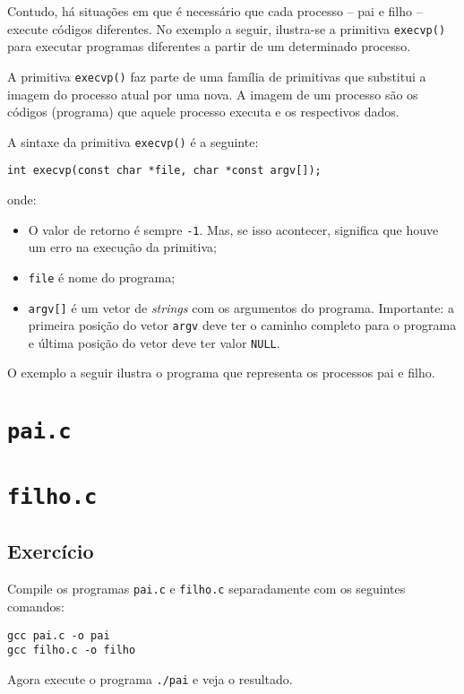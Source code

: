 Contudo, há situações em que é necessário que cada processo -- pai e filho -- execute códigos diferentes. No exemplo a seguir, ilustra-se a primitiva \texttt{execvp()} para executar programas diferentes a partir de um determinado processo. 

A primitiva \texttt{execvp()} faz parte de uma família de primitivas que substitui a imagem do processo atual por uma nova. A imagem de um processo são os códigos (programa) que aquele processo executa e os respectivos dados.

A sintaxe da primitiva \texttt{execvp()} é a seguinte:

\begin{lstlisting}[style=MyCStyle, frame=none, numbers=none]
int execvp(const char *file, char *const argv[]);
\end{lstlisting}
 
onde: 
\begin{itemize}
    \item O valor de retorno é sempre \texttt{-1}. Mas, se isso acontecer, significa que houve um erro na execução da primitiva;
    \item \texttt{file} é nome do programa;
    \item \texttt{argv[]} é um vetor de \textit{strings} com os argumentos do programa. Importante: a primeira posição do vetor \texttt{argv} deve ter o caminho completo para o programa e última posição do vetor deve ter valor \texttt{NULL}.
 \end{itemize}
 
 O exemplo a seguir ilustra o programa que representa os processos pai e filho. 
 \newpage
 
 \section*{\texttt{pai.c}}
 
 
 \section*{\texttt{filho.c}}
 
 
 \subsection{Exercício}
 Compile os programas \texttt{pai.c} e \texttt{filho.c} separadamente com os seguintes comandos:

\begin{lstlisting}[style=MyBashStyle]
gcc pai.c -o pai
gcc filho.c -o filho
\end{lstlisting}


Agora execute o programa \texttt{./pai} e veja o resultado.